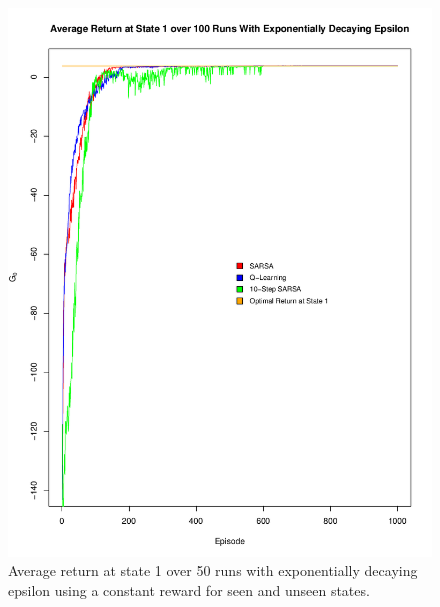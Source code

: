 \documentclass[final,12pt,3p]{elsarticle}
\begin{document}
\begin{figure}[H]
    \centering
    \caption{Average return at state 1 over 50 runs with exponentially decaying epsilon using a constant reward for seen and unseen states.}
    \includegraphics[trim=0 0 0 2cm, clip, width=14cm]{figures/minus005reward.png}
\end{figure}





\end{document}
